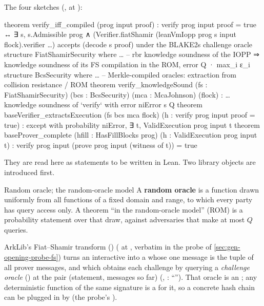 The four sketches (,  at ):

\begin{leancode}
theorem verify_iff_compiled (prog input proof) :
    verify prog input proof = true ↔
      ∃ s, s.Admissible prog ∧ (Verifier.fiatShamir (leanVmIopp prog s input flock).verifier …)
        accepts (decode s proof) under the BLAKE2s challenge oracle
structure FiatShamirSecurity where …   -- rbr knowledge soundness of the IOPP ⇒ knowledge soundness of its FS compilation in the ROM, error Q · max_i ε_i
structure BcsSecurity where …          -- Merkle-compiled oracles: extraction from collision resistance / ROM
theorem verify_knowledgeSound (fs : FiatShamirSecurity) (bcs : BcsSecurity) (mca : McaJohnson) (flock) :
    … knowledge soundness of `verify` with error niError s Q
theorem baseVerifier_extractsExecution (fs bcs mca flock) (h : verify prog input proof = true) :
    except with probability niError, ∃ t, ValidExecution prog input t
theorem baseProver_complete (hfill : HasFillBlocks prog) (h : ValidExecution prog input t) :
    verify prog input (prove prog input (witness of t)) = true
\end{leancode}

They are read here as statements to be written in Lean. Two library objects are introduced first.

\begin{define}{Random oracle; the random-oracle model}
A \textbf{random oracle} is a function drawn uniformly from all functions of a fixed domain and
range, to which every party has query access only. A theorem ``in the random-oracle model'' (ROM)
is a probability statement over that draw, against adversaries that make at most $Q$ queries.
\end{define}

\begin{define}{ArkLib's Fiat--Shamir transform ()}
 ( at , verbatim in the
probe of \cref{sec:gen-opening-probe-fs}) turns an interactive  into a
 whose one message is the tuple of all prover messages, and which
obtains each challenge by querying a \emph{challenge oracle} 
() at the pair (statement, messages so far)
(, : ``'').
That oracle is an ; any deterministic function of the same signature is a
 for it, so a concrete hash chain can be plugged in by  (the probe's
).
\end{define}

